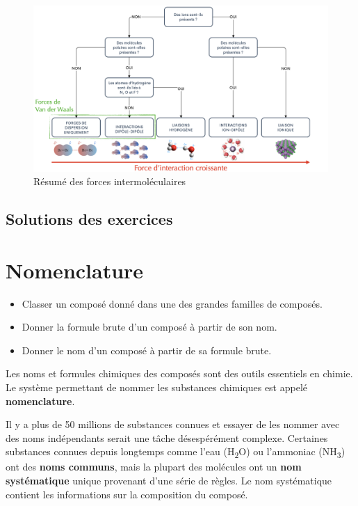 \documentclass[
  11pt,
  a4paper,
  openany]{book}
\providecommand{\tightlist}{%
  \setlength{\itemsep}{0pt}\setlength{\parskip}{0pt}}
\begin{document}
\begin{figure}

{\centering \includegraphics[width=1\linewidth]{images/forces-intermoleculaires-resume} 

}

\caption{Résumé des forces intermoléculaires}\label{fig:forces-intermoleculaires-resume}
\end{figure}

\section{Solutions des exercices} \shipoutAnswer

\chapter{Nomenclature}\label{nomenclature}

\begin{objectives}

\begin{itemize}
\tightlist
\item
  Classer un composé donné dans une des grandes familles de composés.
\item
  Donner la formule brute d'un composé à partir de son nom.
\item
  Donner le nom d'un composé à partir de sa formule brute.
\end{itemize}

\end{objectives}

Les noms et formules chimiques des composés sont des outils essentiels en chimie. Le système permettant de nommer les substances chimiques est appelé \textbf{nomenclature}.

Il y a plus de 50 millions de substances connues et essayer de les nommer avec des noms indépendants serait une tâche désespérément complexe. Certaines substances connues depuis longtemps comme l'eau (H\textsubscript{2}O) ou l'ammoniac (NH\textsubscript{3}) ont des \textbf{noms communs}, mais la plupart des molécules ont un \textbf{nom systématique} unique provenant d'une série de règles. Le nom systématique contient les informations sur la composition du composé.
\end{document}
